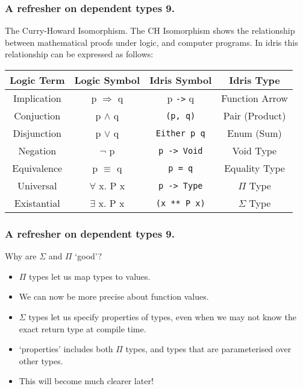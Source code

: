 \documentclass{beamer}
\begin{document}
\begin{frame}[fragile]
  \frametitle{A refresher on dependent types 9.}
  \begin{block}{The Curry-Howard Isomorphism.}
  The CH Isomorphism shows the relationship between mathematical
    proofs under logic, and computer programs. In idris this
    relationship can be expressed as follows:
  \begin{table}[h!]
    \begin{tabular}{c|c|c|c}
    \textbf{Logic Term} & \textbf{Logic Symbol} & \textbf{Idris Symbol}
      & \textbf{Idris Type} \\
    \hline
      Implication & p $\Rightarrow$ q & p \texttt{->} q
      & Function Arrow \\
      Conjuction & p $\land$ q & \texttt{(p, q)} 
      & Pair (Product) \\
      Disjunction & p $\lor$ q & \texttt{Either p q}
      & Enum (Sum)\\
      Negation & $\lnot$ p & \texttt{p -> Void} &
      Void Type \\
      Equivalence & p $\equiv$ q & \texttt{p = q}
      & Equality Type \\
      Universal & $\forall$ x. P x & 
      \texttt{p -> Type} & $\Pi$ Type \\
      Existantial & $\exists$ x. P x
      & \texttt{(x ** P x)} & $\Sigma$ Type
    \end{tabular}
    
  \end{table}
  \end{block}
\end{frame}

\begin{frame}[fragile]
  \frametitle{A refresher on dependent types 9.}
  \begin{block}{Why are $\Sigma$ and $\Pi$ `good'?}
  \begin{itemize}
    \item $\Pi$ types let us map types to values.
    \item We can now be more precise about function values.
    \item $\Sigma$ types let us specify properties of types, even
      when we may not know the exact return type at compile time.
    \item `properties' includes both $\Pi$ types, and types that are
      parameterised over other types.
    \item This will become much clearer later!
  \end{itemize}
  \end{block}
\end{frame}
\end{document}
